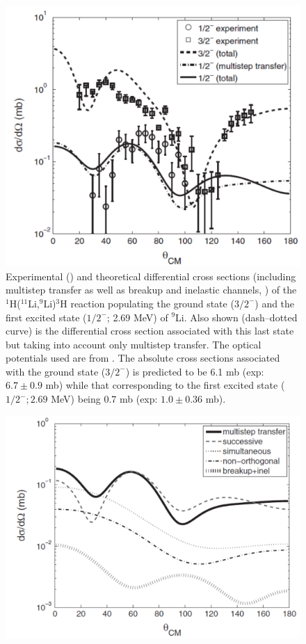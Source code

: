 \begin{subappendices}
    \begin{figure}
    \centerline{\includegraphics*[width=12cm,angle=0]{C8/figsC8/fig8_B_2}}
    	\caption{Experimental (\cite{Tanihata:08}) and theoretical differential cross sections (including multistep transfer as well as breakup and inelastic channels, \cite{Potel:10})  of the
    	$^1$H($^{11}$Li,$^9$Li)$^3$H  reaction populating the ground state ($3/2^-$) and the first excited state ($1/2^-$; 2.69 MeV) of $^{9}$Li. Also shown (dash--dotted curve) is the differential cross section associated with this last state but taking into account only multistep transfer. The optical potentials used are from \citep{Tanihata:08,An:06}. The absolute cross sections associated with the ground state ($3/2^-$) is predicted to be 6.1 mb (exp: $6.7\pm 0.9$ mb) while that corresponding to the first excited state ($1/2^-; 2.69$ MeV) being 0.7 mb (exp: $1.0\pm 0.36$ mb). }\label{fig8_B_2}
    \end{figure}
        \begin{figure}
        \centerline{\includegraphics*[width=12cm,angle=0]{C8/figsC8/fig8_B_3}}

\end{figure}
\end{subappendices}
